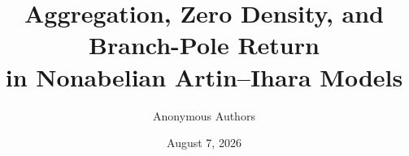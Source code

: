 \documentclass[11pt]{article}
\title{Aggregation, Zero Density, and Branch-Pole Return\\
in Nonabelian Artin--Ihara Models}
\author{Anonymous Authors}
\date{August 7, 2026}
\theoremstyle{definition}
\theoremstyle{remark}
\begin{document}
\maketitle
\begin{abstract}

\end{abstract}









\appendix





\end{document}
